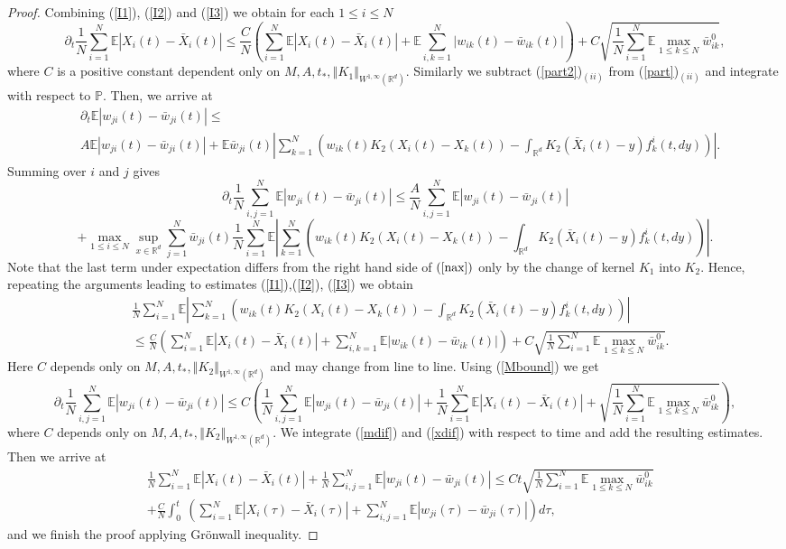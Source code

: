 \documentclass[10pt]{article}
\newcommand{\eqq}[2]{\begin{equation}  #1  \label{#2}\end{equation}    }
\newcommand*{\norm}[1]{\left\Vert{#1}\right\Vert}
\newcommand*{\abs}[1]{\left\vert{#1}\right\vert}
\newcommand{\R}{\mathbb{R}}
\newcommand{\ird}{\int_{\mathbb{R}^d}}
\newcommand{\xb}{\bar{X}}
\newcommand{\p}{\mathbb{P}}
\newcommand{\E}{\mathbb{E}}
\newcommand{\wji}{w_{ji}}
\newcommand{\wjib}{\bar{w}_{ji}}
\newcommand{\fik}{f^i_k}
\begin{document}
\begin{proof}
Combining (\ref{I1}), (\ref{I2}) and (\ref{I3}) we obtain for each $1\leq i \leq N$
\eqq{
\partial_t \frac{1}{N}\sum_{i=1}^N\E \abs{X_i(t) - \xb_i(t)} \leq \frac{C}{N} \left(\sum_{i=1}^N\E \abs{X_i(t) - \xb_i(t)} +  \E \sum_{i,k=1}^N\abs {w_{ik}(t) - \bar{w}_{ik}(t)}\right) + C \sqrt{\frac{1}{N}\sum_{i=1}^N \E \max_{1\leq k\leq N}\bar{w}_{ik}^0},
}{xdif}
where $C$ is a positive constant dependent only on $M,A,t_*,\norm{K_{1}}_{W^{1,\infty}(\R^d)}$. 
Similarly we subtract  (\ref{part2})$_{(ii)}$ from (\ref{part})$_{(ii)}$ and integrate with respect to $\p$. Then, we arrive at
\begin{align}\label{mdifp}
   &\partial_t \E |\wji(t)-\wjib(t)| \leq \\ \nonumber
   & A\E |\wji(t)-\wjib(t)| + \E\wjib(t)\abs{\sum_{k=1}^N \left(w_{ik}(t)K_{2}(X_i(t)-X_k(t)) -  \ird K_{2}(\xb_i(t)-y)\fik(t,dy)\right)}.
\end{align}
Summing over $i$ and $j$ gives
\[
\partial_t\frac{1}{N}  \sum_{i,j=1}^N \E|\wji(t)-\wjib(t)| \leq \frac{A}{N} \sum_{i,j=1}^N \E|\wji(t)-\wjib(t)| 
\]
\[
+\max_{1\leq i \leq N} \sup_{x\in \R^d}\sum_{j=1}^N \wjib(t) \frac{1}{N}\sum_{i=1}^N\E \abs{\sum_{k=1}^N \left(w_{ik}(t)K_{2}(X_i(t)-X_k(t)) -  \ird K_{2}(\xb_i(t)-y)\fik(t,dy)\right)}.
\]
Note that the last term under expectation differs from the right hand side of $(\ref{nax})$ only by the change of kernel $K_1$ into $K_2$. Hence, repeating the arguments leading to estimates (\ref{I1}),(\ref{I2}), (\ref{I3}) we obtain
\begin{align}\label{mdifpp}
    &\frac{1}{N}\sum_{i=1}^N\E\abs{\sum_{k=1}^N \left(w_{ik}(t)K_{2}(X_i(t)-X_k(t)) -  \ird K_{2}(\xb_i(t)-y)\fik(t,dy)\right)} \\ \nonumber
   & \leq \frac{C}{N} \left(\sum_{i=1}^N\E \abs{X_i(t) - \xb_i(t)} +   \sum_{i,k=1}^N \E\abs {w_{ik}(t) - \bar{w}_{ik}(t)}\right) + C \sqrt{\frac{1}{N}\sum_{i=1}^N \E \max_{1\leq k\leq N}\bar{w}_{ik}^0}.
\end{align}
Here $C$ depends only on $M,A,t_*,\norm{K_{2}}_{W^{1,\infty}(\R^d)}$ and may change from line to line.
Using (\ref{Mbound}) we get
\eqq{
\partial_t \frac{1}{N} \sum_{i,j=1}^N \E|\wji(t)-\wjib(t)|  \leq C\left( \frac{1}{N}\sum_{i,j=1}^N \E |w_{ji}(t)-\bar{w}_{ji}(t)| + \frac{1}{N} \sum_{i=1}^N\E \abs{X_i(t) - \xb_i(t)} + \sqrt{\frac{1}{N}\sum_{i=1}^N \E \max_{1\leq k\leq N}\bar{w}_{ik}^0}\right),
}{mdif}
where $C$  depends only on $M,A,t_*,\norm{K_{2}}_{W^{1,\infty}(\R^d)}$. We integrate  (\ref{mdif}) and  (\ref{xdif}) with respect to time and add the resulting estimates. Then we arrive at
\begin{align*}
 &\frac{1}{N}\sum_{i=1}^N \E |X_i(t)-\xb_i(t)|+\frac{1}{N}\sum_{i,j=1}^N \E |\wji(t)-\wjib(t)| \leq Ct\sqrt{\frac{1}{N}\sum_{i=1}^N \E \max_{1\leq k\leq N}\bar{w}_{ik}^0}\\
&+\frac{C}{N}\int_0^t\ \left(\sum_{i=1}^N \E |X_i(\tau)-\xb_i(\tau)|+ \sum_{i,j=1}^N \E |\wji(\tau)-\wjib(\tau)|\right) d\tau,
\end{align*}
and we finish the proof applying Gr\"onwall inequality. 

\end{proof}
\end{document}
